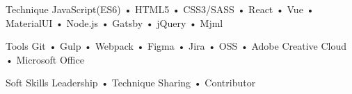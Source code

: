 

\begin{cvskills}

  \cvskill
    {Technique} %
    {JavaScript(ES6) • HTML5 • CSS3/SASS • React • Vue • MaterialUI • Node.js • Gatsby • jQuery • Mjml} %

  \cvskill
    {Tools} %
    {Git • Gulp • Webpack • Figma • Jira • OSS • Adobe Creative Cloud • Microsoft Office} %

  \cvskill
    {Soft Skills} %
    {Leadership • Technique Sharing • Contributor} %

\end{cvskills}

